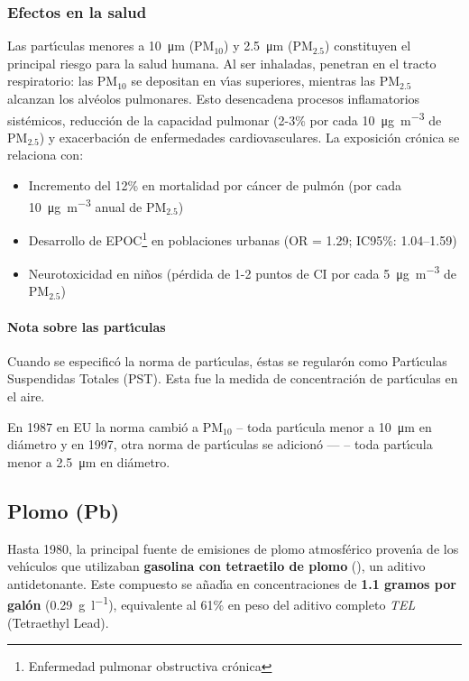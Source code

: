 \subsubsection{Efectos en la salud} 
Las part\'{\i}culas menores a \SI{10}{\micro\metre} (PM$_{10}$) y \SI{2.5}{\micro\metre}  (PM$_{2.5}$) constituyen el principal riesgo para la salud humana. Al ser inhaladas, penetran en el tracto respiratorio: las PM$_{10}$ se depositan en v\'{\i}as superiores, mientras las PM$_{2.5}$ alcanzan los alv\'eolos pulmonares. Esto desencadena procesos inflamatorios sist\'emicos, reducci\'on de la capacidad pulmonar (2-3\% por cada \SI{10}{\micro\gram\per\cubic\metre}  de PM$_{2.5}$) y exacerbaci\'on de enfermedades cardiovasculares. La exposici\'on cr\'onica se relaciona con:
\begin{itemize}
    \item Incremento del 12\% en mortalidad por c\'ancer de pulm\'on (por cada \SI{10}{\micro\gram\per\cubic\metre} anual de PM$_{2.5}$) 
    \item Desarrollo de EPOC\footnote{Enfermedad pulmonar obstructiva cr\'onica} en poblaciones urbanas (OR = 1.29; IC95\%: 1.04–1.59)
    \item Neurotoxicidad en ni\~nos (p\'erdida de 1-2 puntos de CI por cada \SI{5}{\micro\gram\per\cubic\metre} de PM$_{2.5}$)
\end{itemize}

\paragraph{Nota sobre las part\'{\i}culas}
Cuando se especific\'o la norma de part\'{\i}culas, \'estas se regular\'on como Part\'{\i}culas Suspendidas Totales (PST). Esta fue la medida de concentraci\'on de part\'{\i}culas en el aire.

En 1987 en EU la norma cambi\'o a PM$_{10}$ -- toda part\'{\i}cula menor a  \SI{10}{\micro\metre} en di\'ametro y en 1997, otra norma de part\'{\i}culas se adicion\'o ---  -- toda part\'{\i}cula menor a \SI{2.5}{\micro\metre}  en di\'ametro.

\subsection{Plomo (Pb)}
Hasta 1980, la principal fuente de emisiones de plomo atmosf\'erico proven\'{\i}a de los veh\'{\i}culos que utilizaban \textbf{gasolina con tetraetilo de plomo} (), un aditivo antidetonante. Este compuesto se a\~nad\'{\i}a en concentraciones de \textbf{1.1 gramos por gal\'on} (\SI{ 0.29}{\gram\per\litre}), equivalente al 61\% en peso del aditivo completo \textit{TEL} (Tetraethyl Lead). 

